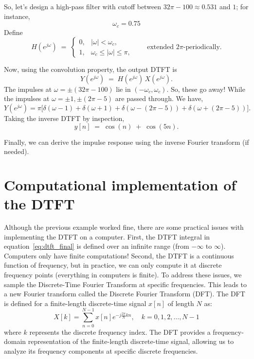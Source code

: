 So, let's design a high-pass filter with cutoff between $32\pi-100\approx0.531$ and $1$; for instance,
\[
\omega_c=0.75
\]
Define
\[
H(e^{j\omega}) \;=\;
\begin{cases}
0, & |\omega|<\omega_c,\\[4pt]
1, & \omega_c\le |\omega|\le \pi,
\end{cases}
\qquad\text{extended $2\pi$-periodically.}
\]

Now, using the convolution property, the output DTFT is
\[
Y(e^{j\omega}) \;=\; H(e^{j\omega})\,X(e^{j\omega}).
\]
The impulses at $\omega=\pm(32\pi-100)$ lie in $(-\omega_c,\omega_c)$. So, these go away! While the impulses at $\omega=\pm 1,\pm(2\pi-5)$ are passed through. We have,
\[
Y(e^{j\omega})
=\pi\big[\delta(\omega-1)+\delta(\omega+1)+\delta(\omega-(2\pi-5))+\delta(\omega+(2\pi-5))\big].
\]
Taking the inverse DTFT by inspection,
\[
y[n] \;=\; \cos(n) \;+\; \cos(5n).
\]

Finally, we can derive the impulse response using the inverse Fourier transform (if needed).

\section{Computational implementation of the DTFT}
Although the previous example worked fine, there are some practical issues with implementing the DTFT on a computer. First, the DTFT integral in equation~\eqref{eq:dtft_final} is defined over an infinite range (from $-\infty$ to $\infty$). Computers only have finite computations! Second, the DTFT is a continuous function of frequency, but in practice, we can only compute it at discrete frequency points (everything in computers is finite). To address these issues, we sample the Discrete-Time Fourier Transform at specific frequencies. This leads to a new Fourier transform called the Discrete Fourier Transform (DFT). The DFT is defined for a finite-length discrete-time signal \( x[n] \) of length \( N \) as:
\begin{equation}
    \label{eq:dft}
X[k] = \sum_{n=0}^{N-1} x[n] e^{-j \frac{2\pi}{N} k n}, \quad k = 0, 1, 2, \ldots, N-1
\end{equation}
where \( k \) represents the discrete frequency index. The DFT provides a frequency-domain representation of the finite-length discrete-time signal, allowing us to analyze its frequency components at specific discrete frequencies.

